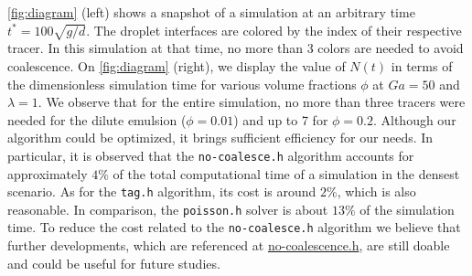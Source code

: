 \ref{fig:diagram} (left) shows a snapshot of a simulation at an arbitrary time $t^* = 100 \sqrt{g/d}$. 
The droplet interfaces are colored by the index of their respective tracer. 
In this simulation at that time, no more than 3 colors are needed to avoid coalescence.
On \ref{fig:diagram} (right), we display the value of $N(t)$ in terms of the dimensionless simulation time for various volume fractions $\phi$ at $Ga = 50$ and  $\lambda = 1$. 
We observe that for the entire simulation, no more than three tracers were needed for the dilute emulsion ($\phi = 0.01$) and up to 7 for $\phi = 0.2$. 
Although our algorithm could be optimized, it brings sufficient efficiency for our needs. 
In particular, it is observed that the \texttt{no-coalesce.h} algorithm accounts for approximately $4\%$ of the total computational time of a simulation in the densest scenario. As for the \texttt{tag.h} algorithm, its cost is around $2\%$, which is also reasonable. In comparison, the \texttt{poisson.h} solver is about $13\%$ of the simulation time. 
To reduce the cost related to the \texttt{no-coalesce.h} algorithm we believe that further developments, which are referenced at \href{http://basilisk.fr/src/no-coalescence.h}{no-coalescence.h}, are still doable and could be useful for future studies.

